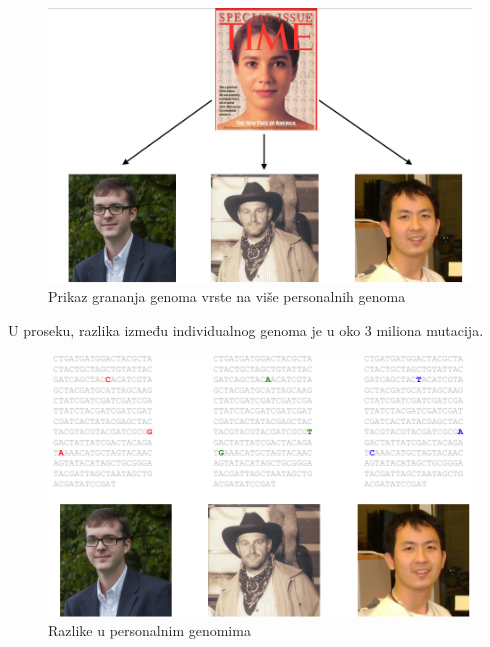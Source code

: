 \begin{figure}[h!]
\centering
\includegraphics[scale=0.5]{poglavlja/9/slike/OdGenomaVrsteDoPersonalnih.png}
\caption{Prikaz grananja genoma vrste na više personalnih genoma}
\label{slika:X}
\end{figure}

U proseku, razlika između individualnog genoma je u oko 3 miliona mutacija.

\begin{figure}[h!]
\centering
\includegraphics[scale=0.5]{poglavlja/9/slike/OdGenomaVrsteDoPersonalnih2.png}
\caption{Razlike u personalnim genomima}
\label{slika:X}
\end{figure}

